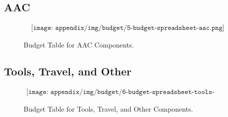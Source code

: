 \begin{landscape}
\subsection{AAC}
\begin{figure}[H]
    \begin{align*}
        \texttt{[image: appendix/img/budget/5-budget-spreadsheet-aac.png]}
    \end{align*}
    \caption{Budget Table for AAC Components.}
    \label{fig:budget-table-for-aac-components}
\end{figure}
\end{landscape}

\begin{landscape}
\subsection{Tools, Travel, and Other}
\begin{figure}[H]
    \begin{align*}
        \texttt{[image: appendix/img/budget/6-budget-spreadsheet-tools-travel-other.png]}
    \end{align*}
    \caption{Budget Table for Tools, Travel, and Other Components.}
    \label{fig:budget-table-for-tools-travel-other-components}
\end{figure}
\end{landscape}